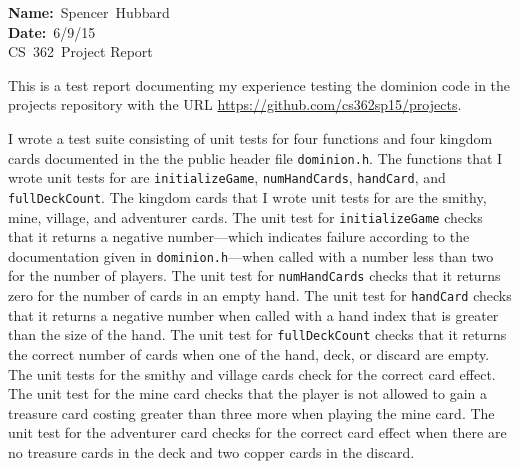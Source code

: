 \documentclass[10pt,letterpaper,notitlepage,draft]{article}
\newcommand\mytitle{
    \noindent\parbox{0.9\textwidth}{
        \noindent
        \textbf{Name:}~Spencer~Hubbard\\
        \textbf{Date:}~6/9/15\\
        CS~362~Project Report
        \vspace{\baselineskip}
    }
}
\begin{document}

\mytitle


This is a test report documenting my experience testing the dominion code in the projects repository with the URL \url{https://github.com/cs362sp15/projects}.

I wrote a test suite consisting of unit tests for four functions and four kingdom cards documented in the the public header file \texttt{dominion.h}.
The functions that I wrote unit tests for are \texttt{initializeGame}, \texttt{numHandCards}, \texttt{handCard}, and \texttt{fullDeckCount}.
The kingdom cards that I wrote unit tests for are the smithy, mine, village, and adventurer cards.
The unit test for \texttt{initializeGame} checks that it returns a negative number---which indicates failure according to the documentation given in \texttt{dominion.h}---when called with a number less than two for the number of players.
The unit test for \texttt{numHandCards} checks that it returns zero for the number of cards in an empty hand.
The unit test for \texttt{handCard} checks that it returns a negative number when called with a hand index that is greater than the size of the hand.
The unit test for \texttt{fullDeckCount} checks that it returns the correct number of cards when one of the hand, deck, or discard are empty.
The unit tests for the smithy and village cards check for the correct card effect.
The unit test for the mine card checks that the player is not allowed to gain a treasure card costing greater than three more when playing the mine card.
The unit test for the adventurer card checks for the correct card effect when there are no treasure cards in the deck and two copper cards in the discard.
\end{document}
